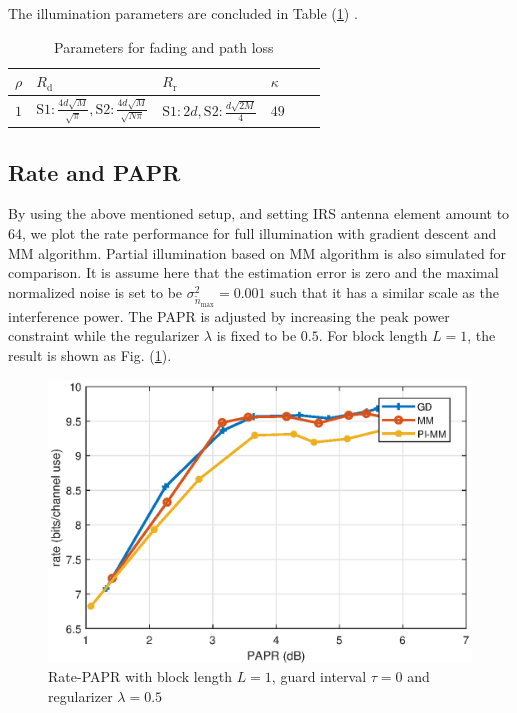 \documentclass[12pt,draftclsnofoot,onecolumn,journal]{IEEEtran}
\begin{document}
The illumination parameters are concluded in Table (\ref{table:illuminationchannel}) \cite{jamali2020intelligent}.
\begin{table}
\begin{tabularx} {1\textwidth}{ 
  | >{\centering\arraybackslash}X 
  | >{\centering\arraybackslash}X 
  | >{\centering\arraybackslash}X
  | >{\centering\arraybackslash}X 
  | >{\centering\arraybackslash}X
  | >{\centering\arraybackslash}X | }
 \hline
 $\rho$		& $R_{\mathrm d}$	& $R_{\mathrm r}$	& $\kappa$	\\
 \hline
 $1$	& $\mathrm S1:\frac{4d\sqrt{M}}{\sqrt{\pi}}, \mathrm S2:\frac{4d\sqrt{M}}{\sqrt{N\pi}}$ 			& $\mathrm S1:2d, \mathrm S2:\frac{d\sqrt{2M}}{4}$ 				&$49$ 	\\
\hline
\end{tabularx}
\caption{Parameters for fading and path loss}
\label{table:illuminationchannel}
\end{table}




\subsection{Rate and PAPR}
By using the above mentioned setup, and setting IRS antenna element amount to 64, we plot the rate performance for full illumination with gradient descent and MM algorithm. Partial illumination based on MM algorithm is also simulated for comparison. It is assume here that the estimation error is zero and the maximal normalized noise is set to be $\sigma^2_{\tilde n_{\mathrm{max}}}=0.001$ such that it has a similar scale as the interference power. The PAPR is adjusted by increasing the peak power constraint while the regularizer $\lambda$ is fixed to be $0.5$. For block length $L=1$, the result is shown as Fig. (\ref{fig:paprL1}).
\begin{figure}[htbp]\flushleft
\includegraphics[width=6in]{L1n-3.eps} 
\caption{Rate-PAPR with block length $L=1$, guard interval $\tau=0$ and regularizer $\lambda=0.5$} \label{fig:paprL1}
\end{figure}
\end{document}
